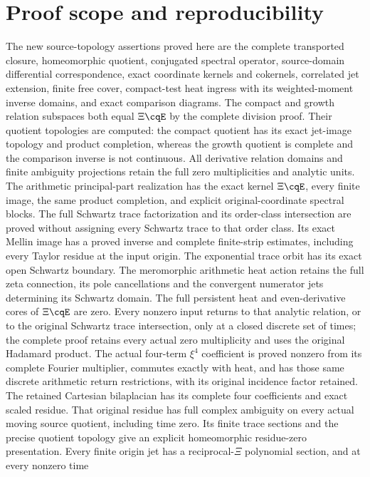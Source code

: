 \section{Proof scope and reproducibility}
The new source-topology assertions proved here are the complete
transported closure, homeomorphic quotient, conjugated spectral
operator, source-domain differential correspondence, exact coordinate
kernels and cokernels, correlated jet extension, finite free cover,
compact-test heat ingress with its weighted-moment inverse domains,
and exact comparison diagrams. The compact and growth relation
subspaces both equal $\Xi\cqE$ by the complete division proof.
Their quotient topologies are computed: the compact quotient has
its exact jet-image topology and product completion, whereas the
growth quotient is complete and the comparison inverse is not
continuous. All derivative relation domains and finite ambiguity
projections retain the full zero multiplicities and analytic units.
The arithmetic principal-part realization has the exact kernel
$\Xi\cqE$, every finite image, the same product completion,
and explicit original-coordinate spectral blocks. The full Schwartz
trace factorization and its order-class intersection are proved
without assigning every Schwartz trace to that order class.
Its exact Mellin image has a proved inverse and complete
finite-strip estimates, including every Taylor residue at the
input origin. The exponential trace orbit has its exact open
Schwartz boundary. The meromorphic arithmetic heat action
retains the full zeta connection, its pole cancellations and
the convergent numerator jets determining its Schwartz domain.
The full persistent heat and even-derivative cores of $\Xi\cqE$
are zero. Every nonzero input returns to that analytic relation,
or to the original Schwartz trace intersection, only at a closed
discrete set of times; the complete proof retains every actual
zero multiplicity and uses the original Hadamard product.
The actual four-term $\xi^4$ coefficient is proved nonzero
from its complete Fourier multiplier, commutes exactly with
heat, and has those same discrete arithmetic return restrictions,
with its original incidence factor retained.
The retained Cartesian bilaplacian has its complete four
coefficients and exact scaled residue. That original residue
has full complex ambiguity on every actual moving source
quotient, including time zero. Its finite trace sections and
the precise quotient topology give an explicit homeomorphic
residue-zero presentation. Every finite origin jet has a
reciprocal-$\Xi$ polynomial section, and at every nonzero time
